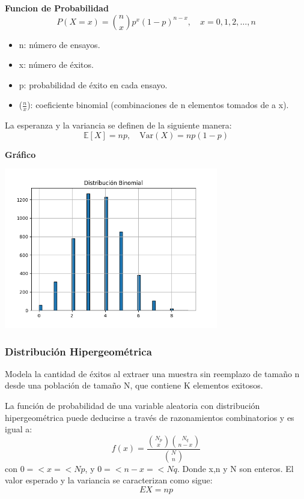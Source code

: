 \documentclass[11pt]{article}
\begin{document}
\noindent\textbf{Funcion de Probabilidad\newline}
\[
P(X = x) = \binom{n}{x} p^x (1 - p)^{n - x}, \quad x = 0, 1, 2, \dots, n
\]
\begin{itemize}
    \item n: número de ensayos.
    \item x: número de éxitos.
    \item p: probabilidad de éxito en cada ensayo. 
    \item ($\frac{n}{x}$): coeficiente binomial (combinaciones de n elementos tomados de a x).
\end{itemize}
La esperanza y la variancia se definen de la siguiente manera:
\[
\mathbb{E}[X] = np, \quad \text{Var}(X) = np(1 - p)
\]

\noindent\textbf{Gráfico\newline}
\begin{center}
\includegraphics[width=0.7\textwidth]{Images/histograma_binomial.png}
\end{center}

\subsubsection{Distribución Hipergeométrica}
Modela la cantidad de éxitos al extraer una muestra sin reemplazo de tamaño n desde una población de tamaño N, que contiene K elementos exitosos.

La función de probabilidad de una variable aleatoria con distribución hipergeométrica puede deducirse a través de razonamientos combinatorios y es igual a:
\begin{equation}
    f(x) = \frac{\binom{N_{p}}{x}\binom{N_{q}}{n-x}}{\binom{N}{n}}
    \end{equation}
  con $0 =< x =< Np$, y $0 =< n-x =<Nq$. Donde x,n y N son enteros. El valor esperado y la variancia se caracterizan como sigue:
  \begin{equation}
    EX = np
    \end{equation}
\end{document}
